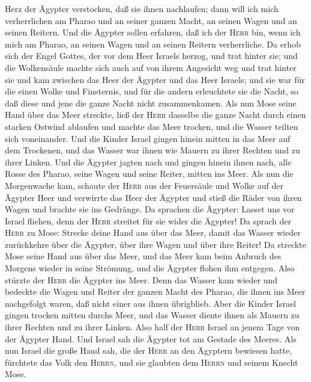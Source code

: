 Herz der Ägypter verstocken, daß sie ihnen nachlaufen; dann will ich
mich verherrlichen am Pharao und an seiner ganzen Macht, an seinen Wagen
und an seinen Reitern.  Und die Ägypter sollen erfahren,
daß ich der \textsc{Herr} bin, wenn ich mich am Pharao, an seinen Wagen
und an seinen Reitern verherrliche.  Da erhob sich der
Engel Gottes, der vor dem Heer Israels herzog, und trat hinter sie; und
die Wolkensäule machte sich auch auf von ihrem Angesicht weg und trat
hinter sie  und kam zwischen das Heer der Ägypter und das
Heer Israels; und sie war für die einen Wolke und Finsternis, und für
die andern erleuchtete sie die Nacht, so daß diese und jene die ganze
Nacht nicht zusammenkamen.  Als nun Mose seine Hand über
das Meer streckte, ließ der \textsc{Herr} dasselbe die ganze Nacht durch
einen starken Ostwind ablaufen und machte das Meer trocken, und die
Wasser teilten sich voneinander.  Und die Kinder Israel
gingen hinein mitten in das Meer auf dem Trockenen, und das Wasser war
ihnen wie Mauern zu ihrer Rechten und zu ihrer Linken. 
Und die Ägypter jagten nach und gingen hinein ihnen nach, alle Rosse des
Pharao, seine Wagen und seine Reiter, mitten ins Meer. 
Als nun die Morgenwache kam, schaute der \textsc{Herr} aus der
Feuersäule und Wolke auf der Ägypter Heer und verwirrte das Heer der
Ägypter  und stieß die Räder von ihren Wagen und brachte
sie ins Gedränge. Da sprachen die Ägypter: Lasset uns vor Israel
fliehen, denn der \textsc{Herr} streitet für sie wider die Ägypter!
 Da sprach der \textsc{Herr} zu Mose: Strecke deine Hand
aus über das Meer, damit das Wasser wieder zurückkehre über die Ägypter,
über ihre Wagen und über ihre Reiter!  Da streckte Mose
seine Hand aus über das Meer, und das Meer kam beim Anbruch des Morgens
wieder in seine Strömung, und die Ägypter flohen ihm entgegen. Also
stürzte der \textsc{Herr} die Ägypter ins Meer.  Denn das
Wasser kam wieder und bedeckte die Wagen und Reiter der ganzen Macht des
Pharao, die ihnen ins Meer nachgefolgt waren, daß nicht einer aus ihnen
übrigblieb.  Aber die Kinder Israel gingen trocken mitten
durchs Meer, und das Wasser diente ihnen als Mauern zu ihrer Rechten und
zu ihrer Linken.  Also half der \textsc{Herr} Israel an
jenem Tage von der Ägypter Hand. Und Israel sah die Ägypter tot am
Gestade des Meeres.  Als nun Israel die große Hand sah,
die der \textsc{Herr} an den Ägyptern bewiesen hatte, fürchtete das Volk
den \textsc{Herrn}, und sie glaubten dem \textsc{Herrn} und seinem
Knecht Mose.

